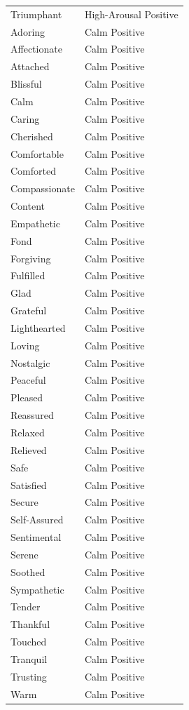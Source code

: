 \begin{longtable}{p{}p{}}
Triumphant & High-Arousal Positive \\
Adoring & Calm Positive \\
Affectionate & Calm Positive \\
Attached & Calm Positive \\
Blissful & Calm Positive \\
Calm & Calm Positive \\
Caring & Calm Positive \\
Cherished & Calm Positive \\
Comfortable & Calm Positive \\
Comforted & Calm Positive \\
Compassionate & Calm Positive \\
Content & Calm Positive \\
Empathetic & Calm Positive \\
Fond & Calm Positive \\
Forgiving & Calm Positive \\
Fulfilled & Calm Positive \\
Glad & Calm Positive \\
Grateful & Calm Positive \\
Lighthearted & Calm Positive \\
Loving & Calm Positive \\
Nostalgic & Calm Positive \\
Peaceful & Calm Positive \\
Pleased & Calm Positive \\
Reassured & Calm Positive \\
Relaxed & Calm Positive \\
Relieved & Calm Positive \\
Safe & Calm Positive \\
Satisfied & Calm Positive \\
Secure & Calm Positive \\
Self-Assured & Calm Positive \\
Sentimental & Calm Positive \\
Serene & Calm Positive \\
Soothed & Calm Positive \\
Sympathetic & Calm Positive \\
Tender & Calm Positive \\
Thankful & Calm Positive \\
Touched & Calm Positive \\
Tranquil & Calm Positive \\
Trusting & Calm Positive \\
Warm & Calm Positive \\
\end{longtable}
